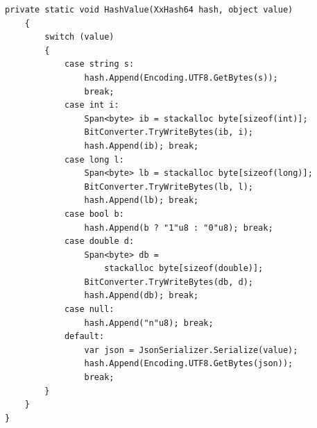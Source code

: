 \begin{lstlisting}[language={[Sharp]C},
  label={lst:app-cached-client},
  caption={Класс CachedAuthJwtClient: кеширование токенов с учётом ротации}]
    private static void HashValue(XxHash64 hash, object value)
    {
        switch (value)
        {
            case string s:
                hash.Append(Encoding.UTF8.GetBytes(s));
                break;
            case int i:
                Span<byte> ib = stackalloc byte[sizeof(int)];
                BitConverter.TryWriteBytes(ib, i);
                hash.Append(ib); break;
            case long l:
                Span<byte> lb = stackalloc byte[sizeof(long)];
                BitConverter.TryWriteBytes(lb, l);
                hash.Append(lb); break;
            case bool b:
                hash.Append(b ? "1"u8 : "0"u8); break;
            case double d:
                Span<byte> db =
                    stackalloc byte[sizeof(double)];
                BitConverter.TryWriteBytes(db, d);
                hash.Append(db); break;
            case null:
                hash.Append("n"u8); break;
            default:
                var json = JsonSerializer.Serialize(value);
                hash.Append(Encoding.UTF8.GetBytes(json));
                break;
        }
    }
}
\end{lstlisting}

